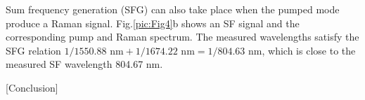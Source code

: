 \documentclass[a4paper,8pt,hyperref, twocolumn]{article}
\begin{document}

 Sum frequency generation (SFG) can also take place when the pumped mode produce a Raman signal. Fig.\ref{pic:Fig4}b shows an SF signal and the corresponding pump and Raman spectrum.  The measured wavelengths satisfy the SFG relation $1/1550.88$ $\mathrm{nm} +1/1674.22$ $\mathrm{nm} = 1/804.63$ $\mathrm{nm}$, which is close to the measured SF wavelength 804.67 nm.

[Conclusion]





\end{document}
